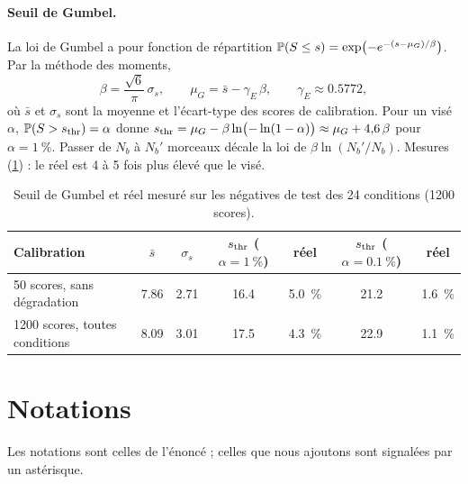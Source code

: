 \paragraph{Seuil de Gumbel.} La loi de Gumbel a pour fonction de répartition
$\mathbb{P}(S \le s) = \exp\bigl(-e^{-(s-\mu_G)/\beta}\bigr)$. Par la méthode des moments,
\[
  \beta = \frac{\sqrt{6}}{\pi}\,\sigma_s , \qquad \mu_G = \bar{s} - \gamma_E\,\beta ,
  \qquad \gamma_E \approx \num{0.5772},
\]
où $\bar{s}$ et $\sigma_s$ sont la moyenne et l'écart-type des scores de calibration. Pour un
\TFD{} visé $\alpha$, $\mathbb{P}(S > s_{\mathrm{thr}}) = \alpha$ donne
$s_{\mathrm{thr}} = \mu_G - \beta \ln\bigl(-\ln(1 - \alpha)\bigr) \approx \mu_G + \num{4.6}\,\beta$ pour
$\alpha = \qty{1}{\percent}$. Passer de $N_b$ à $N_b'$ morceaux décale la loi de
$\beta\ln(N_b'/N_b)$. Mesures (\cref{tab-gumbel}) : le \TFD{} réel est 4 à 5 fois plus élevé
que le \TFD{} visé.

\begin{table}[h]
  \centering\small
  \caption{Seuil de Gumbel et \TFD{} réel mesuré sur les négatives de test des 24 conditions
  (\num{1200} scores).}
  \label{tab-gumbel}
  \begin{tabular}{@{}lcccccc@{}}
    \toprule
    Calibration & $\bar{s}$ & $\sigma_s$ & $s_{\mathrm{thr}}$ ($\alpha = \qty{1}{\percent}$) & \TFD{} réel & $s_{\mathrm{thr}}$ ($\alpha = \qty{0.1}{\percent}$) & \TFD{} réel \\
    \midrule
    50 scores, sans dégradation & \num{7.86} & \num{2.71} & \num{16.4} & \qty{5.0}{\percent} & \num{21.2} & \qty{1.6}{\percent} \\
    \num{1200} scores, toutes conditions & \num{8.09} & \num{3.01} & \num{17.5} & \qty{4.3}{\percent} & \num{22.9} & \qty{1.1}{\percent} \\
    \bottomrule
  \end{tabular}
\end{table}

\clearpage
\section{Notations}
\label{sec-notations}

Les notations sont celles de l'énoncé ; celles que nous ajoutons sont signalées par un
astérisque.

